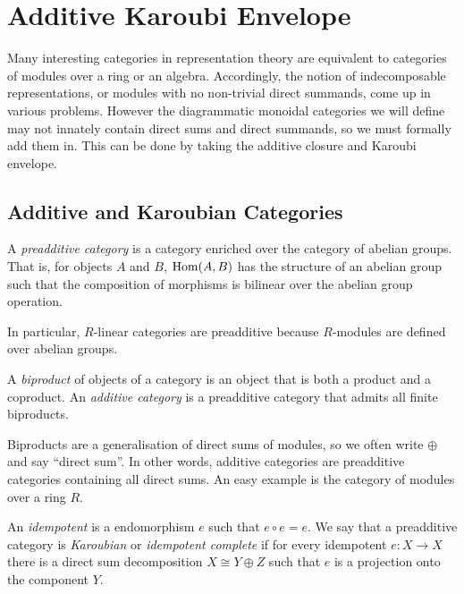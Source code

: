\section{Additive Karoubi Envelope}
\label{sec:additive-karoubi}

Many interesting categories in representation theory are equivalent to categories of modules over a ring or an algebra. Accordingly, the notion of indecomposable representations, or modules with no non-trivial direct summands, come up in various problems. However the diagrammatic monoidal categories we will define may not innately contain direct sums and direct summands, so we must formally add them in. This can be done by taking the additive closure and Karoubi envelope.

\subsection*{Additive and Karoubian Categories}

\begin{definition}
    A \textit{preadditive category} is a category enriched over the category of abelian groups. That is, for objects $A$ and $B$, $\operatorname{Hom}(A,B)$ has the structure of an abelian group such that the composition of morphisms is bilinear over the abelian group operation.
\end{definition}

In particular, $R$-linear categories are preadditive because $R$-modules are defined over abelian groups.

\begin{definition}
    A \textit{biproduct} of objects of a category is an object that is both a product and a coproduct.
    An \textit{additive category} is a preadditive category that admits all finite biproducts.
\end{definition}

Biproducts are a generalisation of direct sums of modules, so we often write $\oplus$ and say ``direct sum''. In other words, additive categories are preadditive categories containing all direct sums. An easy example is the category of modules over a ring $R$.

\begin{definition}
    An \textit{idempotent} is a endomorphism $e$ such that $e \circ e = e$.
    We say that a preadditive category is \textit{Karoubian} or \textit{idempotent complete} if for every idempotent $e: X \to X$ there is a direct sum decomposition $X \cong Y \oplus Z$ such that $e$ is a projection onto the component $Y$.
\end{definition}

